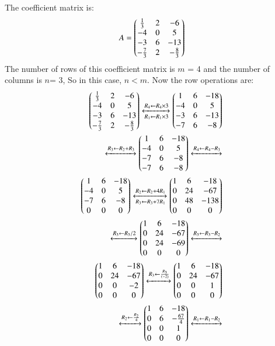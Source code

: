 The coefficient matrix is:
\begin{align}
A=\begin{pmatrix}\frac{1}{3} & 2 & -6\\-4 & 0 & 5\\-3 & 6 & -13\\-\frac{7}{3} & 2 & -\frac{8}{3}\end{pmatrix}
\end{align}
The number of rows of this coefficient matrix is $m$ = 4 and the number of columns is $n$= 3, So in this case, $n<m$.
Now the row operations are:
\begin{align}
\myvec{\frac{1}{3} & 2 & -6\\-4 & 0 & 5\\-3 & 6 & -13\\-\frac{7}{3} & 2 & -\frac{8}{3}}\xleftrightarrow[R_1\leftarrow R_1\times3]{R_4\leftarrow R_4\times3}
\myvec{1 & 6 & -18\\-4 & 0 & 5\\-3 & 6 & -13\\-7 & 6 & -8}\\
\xleftrightarrow[]{R_3\leftarrow R_2+R_3}
\myvec{1 & 6 & -18\\-4 & 0 & 5\\-7 & 6 & -8\\-7 & 6 & -8}\xleftrightarrow[]{R_4\leftarrow R_4-R_3}\\
\myvec{1 & 6 & -18\\-4 & 0 & 5\\-7 & 6 & -8\\0 & 0 & 0}\xleftrightarrow[R_3\leftarrow R_3+7R_1]{R_2\leftarrow R_2+4R_1}
\myvec{1 & 6 & -18\\0 & 24 & -67\\0 & 48 & -138\\0 & 0 & 0}\\
\xleftrightarrow[]{R_3\leftarrow R_3/2}\myvec{1 & 6 & -18\\0 & 24 & -67\\0 & 24 & -69\\0 & 0 & 0}\xleftrightarrow[]{R_3\leftarrow R_3-R_2}\\
\myvec{1 & 6 & -18\\0 & 24 & -67\\0 & 0 & -2\\0 & 0 & 0}\xleftrightarrow[]{R_3\leftarrow \frac{R_3}{(-2)}}
\myvec{1 & 6 & -18\\0 & 24 & -67\\0 & 0 & 1\\0 & 0 & 0}\\
\xleftrightarrow[]{R_2\leftarrow \frac{R_2}{4}}
\myvec{1 & 6 & -18\\0 & 6 & -\frac{67}{4}\\0 & 0 & 1\\0 & 0 & 0}\xleftrightarrow[]{R_1\leftarrow R_1-R_2}\\

\end{align}
